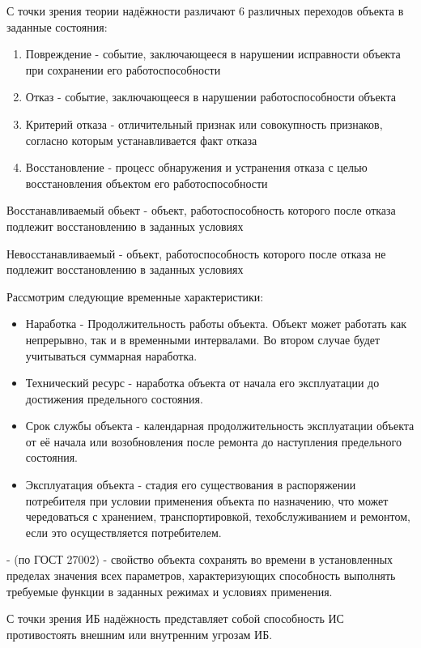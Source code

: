 \documentclass[a4paper, 12pt]{extarticle}
\begin{document}
		С точки зрения теории надёжности различают 6 различных переходов объекта в заданные состояния:
		\begin{enumerate}
			\item Повреждение - событие, заключающееся в нарушении исправности объекта при сохранении его работоспособности
			\item Отказ - событие, заключающееся в нарушении работоспособности объекта
			\item Критерий отказа - отличительный признак или совокупность признаков, согласно которым устанавливается факт отказа
			\item Восстановление - процесс обнаружения и устранения отказа с целью восстановления объектом его работоспособности
		\end{enumerate}

		Восстанавливаемый обьект - объект, работоспособность которого после отказа подлежит восстановлению в заданных условиях

		Невосстанавливаемый - объект, работоспособность которого после отказа не подлежит восстановлению в заданных условиях

		Рассмотрим следующие временные характеристики:
		\begin{itemize}
			\item Наработка - Продолжительность работы объекта. Объект может работать как непрерывно, так и в временными интервалами. Во втором случае будет учитываться суммарная наработка.
			\item Технический ресурс - наработка объекта от начала его эксплуатации до достижения предельного состояния.
			\item Срок службы объекта - календарная продолжительность эксплуатации объекта от её начала или возобновления после ремонта до наступления предельного состояния.
			\item Эксплуатация объекта - стадия его существования в распоряжении потребителя при условии применения объекта по назначению, что может чередоваться с хранением, транспортировкой, техобслуживанием и ремонтом, если это осуществляется потребителем.
		\end{itemize}

		 - (по ГОСТ 27002) - свойство объекта сохранять во времени в установленных пределах значения всех параметров, характеризующих способность выполнять требуемые функции в заданных режимах и условиях применения.

		С точки зрения ИБ надёжность представляет собой способность ИС противостоять внешним или внутренним угрозам ИБ.
\end{document}
